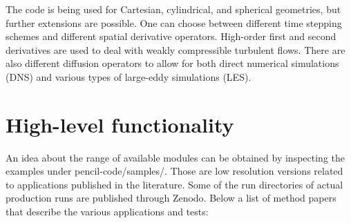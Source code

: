 \documentclass[10pt,a4paper,onecolumn]{article}
\begin{document}
The code is being used for Cartesian, cylindrical, and spherical
geometries, but further extensions are possible. One can choose between
different time stepping schemes and different spatial derivative
operators. High-order first and second derivatives are used to deal with
weakly compressible turbulent flows. There are also different diffusion
operators to allow for both direct numerical simulations (DNS) and
various types of large-eddy simulations (LES).

\hypertarget{high-level-functionality}{%
\section{High-level functionality}\label{high-level-functionality}}

An idea about the range of available modules can be obtained by
inspecting the examples under pencil-code/samples/. Those are low
resolution versions related to applications published in the literature.
Some of the run directories of actual production runs are published
through Zenodo. Below a list of method papers that describe the various
applications and tests:
\end{document}
